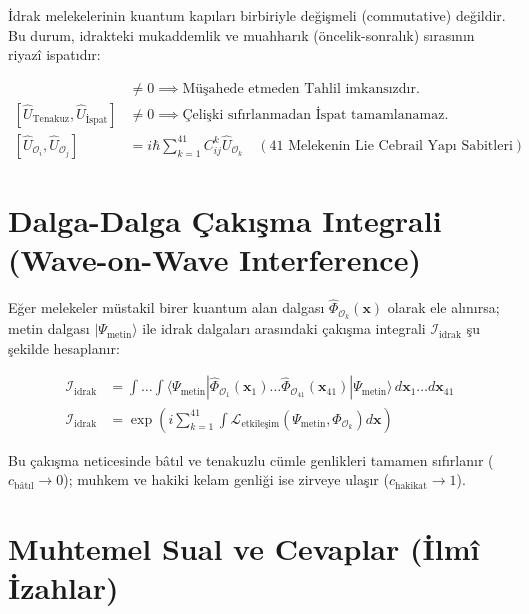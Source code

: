 \documentclass[11pt, a4paper]{article}
\begin{document}
İdrak melekelerinin kuantum kapıları birbiriyle değişmeli (commutative) değildir. Bu durum, idrakteki mukaddemlik ve muahharık (öncelik-sonralık) sırasının riyazî ispatıdır:

\begin{align}
[\hat{U}_{\text{Müşahede}}, \hat{U}_{\text{Tahlil}}] &\neq 0 \implies \text{Müşahede etmeden Tahlil imkansızdır.} \\
[\hat{U}_{\text{Tenakuz}}, \hat{U}_{\text{İspat}}] &\neq 0 \implies \text{Çelişki sıfırlanmadan İspat tamamlanamaz.} \\
[\hat{U}_{\mathcal{O}_i}, \hat{U}_{\mathcal{O}_j}] &= i \hbar \sum_{k=1}^{41} C_{ij}^k \hat{U}_{\mathcal{O}_k} \quad (\text{41 Melekenin Lie Cebrail Yapı Sabitleri})
\end{align}

\section{Dalga-Dalga Çakışma Integrali (Wave-on-Wave Interference)}

Eğer melekeler müstakil birer kuantum alan dalgası $\hat{\Phi}_{\mathcal{O}_k}(\mathbf{x})$ olarak ele alınırsa; metin dalgası $|\Psi_{\text{metin}}\rangle$ ile idrak dalgaları arasındaki çakışma integrali $\mathcal{I}_{\text{idrak}}$ şu şekilde hesaplanır:

\begin{align}
\mathcal{I}_{\text{idrak}} &= \int \dots \int \langle \Psi_{\text{metin}} | \hat{\Phi}_{\mathcal{O}_1}(\mathbf{x}_1) \dots \hat{\Phi}_{\mathcal{O}_{41}}(\mathbf{x}_{41}) | \Psi_{\text{metin}} \rangle \, d\mathbf{x}_1 \dots d\mathbf{x}_{41} \\
\mathcal{I}_{\text{idrak}} &= \exp\left( i \sum_{k=1}^{41} \int \mathcal{L}_{\text{etkileşim}}\left( \Psi_{\text{metin}}, \Phi_{\mathcal{O}_k} \right) d\mathbf{x} \right)
\end{align}

Bu çakışma neticesinde bâtıl ve tenakuzlu cümle genlikleri tamamen sıfırlanır ($c_{\text{bâtıl}} \to 0$); muhkem ve hakiki kelam genliği ise zirveye ulaşır ($c_{\text{hakikat}} \to 1$).

\section{Muhtemel Sual ve Cevaplar (İlmî İzahlar)}
\end{document}
